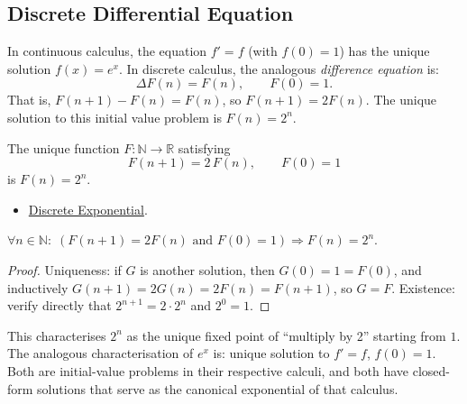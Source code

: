\subsection*{Discrete Differential Equation}

In continuous calculus, the equation \(f' = f\) (with \(f(0) = 1\)) has the
unique solution \(f(x) = e^x\). In discrete calculus, the analogous
\emph{difference equation} is:
\[
\Delta F(n) = F(n), \qquad F(0) = 1.
\]
That is, \(F(n+1) - F(n) = F(n)\), so \(F(n+1) = 2F(n)\). The unique solution
to this initial value problem is \(F(n) = 2^n\).

\begin{proposition}
\label{prop:discrete-ivp}
The unique function \(F : \mathbb{N} \to \mathbb{R}\) satisfying
\[
F(n+1) = 2\,F(n), \qquad F(0) = 1
\]
is \(F(n) = 2^n\).
\end{proposition}

\begin{dependencies}
\begin{itemize}
  \item \hyperref[def:discrete-exponential]{Discrete Exponential}.
\end{itemize}
\end{dependencies}

\begin{remark*}
\(\forall n \in \mathbb{N}:\;
(F(n+1) = 2F(n)\text{ and }F(0)=1) \Rightarrow F(n) = 2^n\).
\end{remark*}

\begin{proof}
Uniqueness: if \(G\) is another solution, then \(G(0) = 1 = F(0)\), and
inductively \(G(n+1) = 2G(n) = 2F(n) = F(n+1)\), so \(G = F\).
Existence: verify directly that \(2^{n+1} = 2\cdot 2^n\) and \(2^0 = 1\).
\end{proof}

\begin{remark*}[Significance]
This characterises \(2^n\) as the unique fixed point of ``multiply by 2''
starting from \(1\). The analogous characterisation of \(e^x\) is: unique
solution to \(f' = f\), \(f(0) = 1\). Both are initial-value problems in
their respective calculi, and both have closed-form solutions that serve as
the canonical exponential of that calculus.
\end{remark*}
